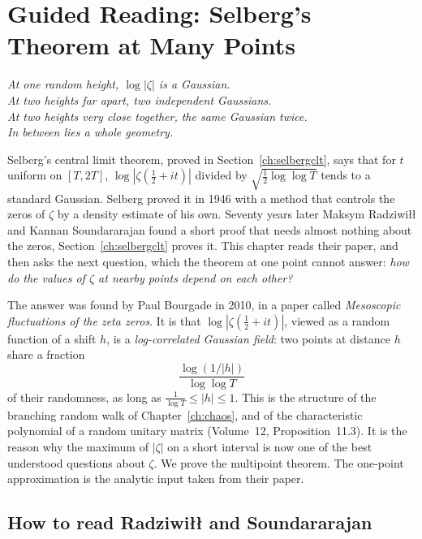 \chapter{Guided Reading: Selberg's Theorem at Many Points}
\label{ch:selberg}

\begin{center}\itshape
At one random height, $\log|\zeta|$ is a Gaussian.\\
At two heights far apart, two independent Gaussians.\\
At two heights very close together, the same Gaussian twice.\\
In between lies a whole geometry.
\end{center}

Selberg's central limit theorem, proved in Section~\ref{ch:selbergclt}, says that for $t$ uniform on $[T,2T]$, $\log|\zeta(\frac12+it)|$ divided by $\sqrt{\frac12\log\log T}$ tends to a standard Gaussian. Selberg proved it in 1946 with a method that controls the zeros of $\zeta$ by a density estimate of his own. Seventy years later Maksym Radziwi\l\l{} and Kannan Soundararajan found a short proof that needs almost nothing about the zeros, Section~\ref{ch:selbergclt} proves it. This chapter reads their paper, and then asks the next question, which the theorem at one point cannot answer: \emph{how do the values of $\zeta$ at nearby points depend on each other?}

The answer was found by Paul Bourgade in 2010, in a paper called \emph{Mesoscopic fluctuations of the zeta zeros}. It is that $\log|\zeta(\frac12+it)|$, viewed as a random function of a shift $h$, is a \emph{log-correlated Gaussian field}: two points at distance $h$ share a fraction
\[
\frac{\log(1/|h|)}{\log\log T}
\]
of their randomness, as long as $\frac1{\log T}\le|h|\le1$. This is the structure of the branching random walk of Chapter~\ref{ch:chaos}, and of the characteristic polynomial of a random unitary matrix (Volume~12, Proposition~11.3). It is the reason why the maximum of $|\zeta|$ on a short interval is now one of the best understood questions about $\zeta$. We prove the multipoint theorem. The one-point approximation is the analytic input taken from their paper.

\section{How to read Radziwi\l\l{} and Soundararajan}

